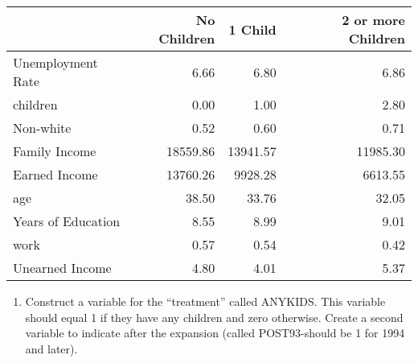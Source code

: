 \documentclass[
]{article}
\newenvironment{Shaded}{\begin{snugshade}}{\end{snugshade}}
\newcommand{\CommentTok}[1]{\textcolor[rgb]{0.56,0.35,0.01}{\textit{#1}}}
\newcommand{\DecValTok}[1]{\textcolor[rgb]{0.00,0.00,0.81}{#1}}
\newcommand{\FunctionTok}[1]{\textcolor[rgb]{0.13,0.29,0.53}{\textbf{#1}}}
\newcommand{\NormalTok}[1]{#1}
\newcommand{\OtherTok}[1]{\textcolor[rgb]{0.56,0.35,0.01}{#1}}
\newcommand{\SpecialCharTok}[1]{\textcolor[rgb]{0.81,0.36,0.00}{\textbf{#1}}}
\providecommand{\tightlist}{%
  \setlength{\itemsep}{0pt}\setlength{\parskip}{0pt}}
\begin{document}
\begin{table}
\centering
\begin{tabular}[t]{lrrr}
\toprule
  & No Children & 1 Child & 2 or more Children\\
\midrule
Unemployment Rate & \num{6.66} & \num{6.80} & \num{6.86}\\
children & \num{0.00} & \num{1.00} & \num{2.80}\\
Non-white & \num{0.52} & \num{0.60} & \num{0.71}\\
Family Income & \num{18559.86} & \num{13941.57} & \num{11985.30}\\
Earned Income & \num{13760.26} & \num{9928.28} & \num{6613.55}\\
age & \num{38.50} & \num{33.76} & \num{32.05}\\
Years of Education & \num{8.55} & \num{8.99} & \num{9.01}\\
work & \num{0.57} & \num{0.54} & \num{0.42}\\
Unearned Income & \num{4.80} & \num{4.01} & \num{5.37}\\
\bottomrule
\end{tabular}
\end{table}

\begin{enumerate}
\def\labelenumi{\arabic{enumi}.}
\setcounter{enumi}{2}
\tightlist
\item
  Construct a variable for the ``treatment'' called ANYKIDS. This
  variable should equal 1 if they have any children and zero otherwise.
  Create a second variable to indicate after the expansion (called
  POST93-should be 1 for 1994 and later).
\end{enumerate}

\begin{Shaded}
\end{Shaded}
\end{document}

